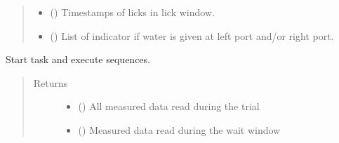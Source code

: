 \documentclass[letterpaper,10pt,english]{sphinxmanual}
\begin{document}
\begin{fulllineitems}
\begin{fulllineitems}
\begin{quote}
\begin{description}
\begin{itemize}
\item {} 
\sphinxAtStartPar
{} () \textendash{} Timestamps of licks in lick window.

\item {} 
\sphinxAtStartPar
{} () \textendash{} List of indicator if water is given at left port and/or right port.

\end{itemize}


\end{description}\end{quote}

\end{fulllineitems}


\begin{fulllineitems}
\label{\detokenize{NoSeMazeControl/daqface:daqface.DAQ.DoAiMultiTaskWaitTraining.ClearTasks}}
\pysigstartsignatures
{}
\pysigstopsignatures
\end{fulllineitems}


\begin{fulllineitems}
\label{\detokenize{NoSeMazeControl/daqface:daqface.DAQ.DoAiMultiTaskWaitTraining.DoTask}}
\pysigstartsignatures
{}
\pysigstopsignatures
\sphinxAtStartPar
Start task and execute sequences.
\begin{quote}\begin{description}
\item[{Returns}] \leavevmode
\sphinxAtStartPar
\begin{itemize}
\item {} 
\sphinxAtStartPar
{} () \textendash{} All measured data read during the trial

\item {} 
\sphinxAtStartPar
{} () \textendash{} Measured data read during the wait window


\end{itemize}
\end{description}
\end{quote}
\end{fulllineitems}
\end{fulllineitems}
\end{document}
